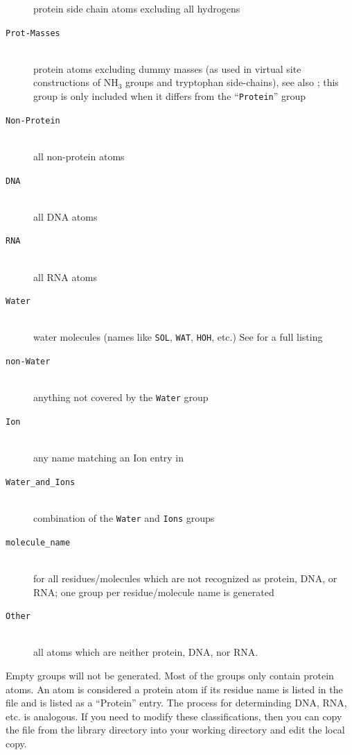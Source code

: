 \begin{description}
        protein side chain atoms excluding all hydrogens
\item[{\tt Prot-Masses}]\mbox{}\\
        protein atoms excluding dummy masses (as used in virtual site
        constructions of NH$_3$ groups and tryptophan side-chains),
        see also ; this group is only included when
        it differs from the ``{\tt Protein}'' group
\item[{\tt Non-Protein}]\mbox{}\\
        all non-protein atoms
\item[{\tt DNA}]\mbox{}\\
        all DNA atoms
\item[{\tt RNA}]\mbox{}\\
        all RNA atoms
\item[{\tt Water}]\mbox{}\\
        water molecules (names like {\tt SOL}, {\tt WAT}, {\tt HOH}, etc.)  See
        {\tt {}} for a full listing
\item[{\tt non-Water}]\mbox{}\\
        anything not covered by the {\tt Water} group
\item[{\tt Ion}]\mbox{}\\
        any name matching an Ion entry in {\tt {}}
\item[{\tt Water_and_Ions}]\mbox{}\\
        combination of the {\tt Water} and {\tt Ions} groups 
\item[{\tt molecule_name}]\mbox{}\\
        for all residues/molecules which are not recognized as protein,
        DNA, or RNA; one group per residue/molecule name is generated
\item[{\tt Other}]\mbox{}\\
        all atoms which are neither protein, DNA, nor RNA.
\end{description}
Empty groups will not be generated.
Most of the groups only contain protein atoms.
An atom is considered a protein atom if its residue name is listed
in the {\tt {}} file and is listed as a
``Protein'' entry.  The process for determinding DNA, RNA, etc. is
analogous. If you need to modify these classifications, then you
can copy the file from the library directory into your working
directory and edit the local copy.


